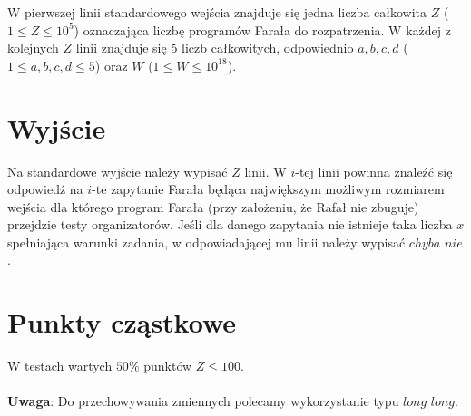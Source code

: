 \documentclass[zad,zawodnik,utf8]{sinol}
\begin{document}
\begin{tasktext}
\iffalse
	Na standardowym wejściu znajdują się liczby $n, q$ ($1 \leq n \leq 2000$, $1 \leq q \leq 10^5$), oznaczające rozmiar fontanny oraz liczbę zapytań. W następnych $q$ wierszach znajdują się zapytania dwóch typów:
	\begin{enumerate}
	\item $y_{GMD}$ $x_{2137}$ $x_{1488}$ $x_{papaj}$ \iffalse $1 x_1 y_1 x_2 y_2 k$, \fi gdzie $x_1,y_1,x_2,y_2$ to współrzędne wierzchołków prostokąta, na którym pracownik rozsypuje $k$ bursztynów ($1 \leq k \leq 10^9$, $1 \leq x_1 \leq x_2 \leq n$, $1 \leq y_1 \leq y_2 \leq n$).
	\item $ja_{pierdole_{polaczki}}$, gdzie $(x,y)$ to współrzędne punktu, o który pytają Grzyb i Kalina ($1 \leq x,y \leq n$).
	\end{enumerate}
\fi

W pierwszej linii standardowego wejścia znajduje się jedna liczba całkowita $Z$ ($1 \leq Z \leq 10^5$) oznaczająca liczbę programów Farała do rozpatrzenia.  W każdej z kolejnych $Z$ linii znajduje się 5 liczb całkowitych, odpowiednio $a, b, c, d$ ($1 \leq a, b, c, d \leq 5$) oraz $W$ ($1 \leq W \leq 10^{18}$).

	\section{Wyjście}
	Na standardowe wyjście należy wypisać $Z$ linii. W $i$-tej linii powinna znaleźć się odpowiedź na $i$-te zapytanie Farała będąca największym możliwym rozmiarem wejścia dla którego program Farała (przy założeniu, że Rafał nie zbuguje) przejdzie testy organizatorów. Jeśli dla danego zapytania nie istnieje taka liczba $x$ spełniająca warunki zadania, w odpowiadającej mu linii należy wypisać $chyba$ $nie$.
	\makecompactexample
	\iffalse
	\section{Wyjaśnienie do przykładu}
	A rafał, to lubi jeść kupę.
	\fi
	\section{Punkty cząstkowe}
	W testach wartych $50\%$ punktów $Z \leq 100$.
	\\
	\\
	\textbf{Uwaga}: Do przechowywania zmiennych polecamy wykorzystanie typu $long$ $long$.

\end{tasktext}
\end{document}

